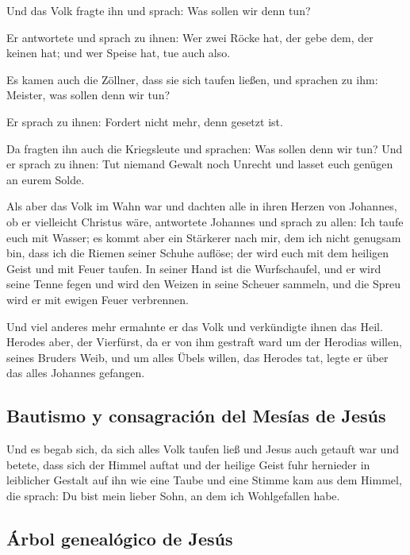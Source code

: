  Und das Volk fragte ihn und sprach: Was sollen wir denn
tun?

 Er antwortete und sprach zu ihnen: Wer zwei Röcke hat,
der gebe dem, der keinen hat; und wer Speise hat, tue auch also.

 Es kamen auch die Zöllner, dass sie sich taufen ließen,
und sprachen zu ihm: Meister, was sollen denn wir tun?

 Er sprach zu ihnen: Fordert nicht mehr, denn gesetzt
ist.

 Da fragten ihn auch die Kriegsleute und sprachen: Was
sollen denn wir tun? Und er sprach zu ihnen: Tut niemand Gewalt noch
Unrecht und lasset euch genügen an eurem Solde.

 Als aber das Volk im Wahn war und dachten alle in ihren
Herzen von Johannes, ob er vielleicht Christus wäre, 
antwortete Johannes und sprach zu allen: Ich taufe euch mit Wasser; es
kommt aber ein Stärkerer nach mir, dem ich nicht genugsam bin, dass ich
die Riemen seiner Schuhe auflöse; der wird euch mit dem heiligen Geist
und mit Feuer taufen.  In seiner Hand ist die
Wurfschaufel, und er wird seine Tenne fegen und wird den Weizen in seine
Scheuer sammeln, und die Spreu wird er mit ewigen Feuer verbrennen.

 Und viel anderes mehr ermahnte er das Volk und
verkündigte ihnen das Heil.  Herodes aber, der Vierfürst,
da er von ihm gestraft ward um der Herodias willen, seines Bruders Weib,
und um alles Übels willen, das Herodes tat,  legte er
über das alles Johannes gefangen.

\hypertarget{bautismo-y-consagraciuxf3n-del-mesuxedas-de-jesuxfas}{%
\subsection{Bautismo y consagración del Mesías de
Jesús}\label{bautismo-y-consagraciuxf3n-del-mesuxedas-de-jesuxfas}}

 Und es begab sich, da sich alles Volk taufen ließ und
Jesus auch getauft war und betete, dass sich der Himmel auftat
 und der heilige Geist fuhr hernieder in leiblicher
Gestalt auf ihn wie eine Taube und eine Stimme kam aus dem Himmel, die
sprach: Du bist mein lieber Sohn, an dem ich Wohlgefallen habe.

\hypertarget{uxe1rbol-genealuxf3gico-de-jesuxfas}{%
\subsection{Árbol genealógico de
Jesús}\label{uxe1rbol-genealuxf3gico-de-jesuxfas}}

